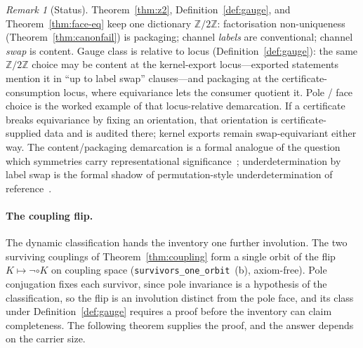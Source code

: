 \documentclass[11pt,a4paper]{article}
\theoremstyle{plain}
\theoremstyle{definition}
\theoremstyle{remark}
\newtheorem{remark}[theorem]{Remark}
\newcommand{\comp}{\circ}
\newcommand{\Ztwo}{\mathbb{Z}/2\mathbb{Z}}
\begin{document}
\begin{remark}[Status]
Theorem~\ref{thm:z2}, Definition~\ref{def:gauge}, and
Theorem~\ref{thm:face-eq} keep one dictionary $\Ztwo$: factorisation
non-uniqueness (Theorem~\ref{thm:canonfail}) is packaging; channel
\emph{labels} are conventional; channel \emph{swap} is content. Gauge
class is relative to locus
(Definition~\ref{def:gauge}): the same $\Ztwo$ choice may be content at
the kernel-export locus---exported statements mention it in ``up to
label swap'' clauses---and packaging at the certificate-consumption
locus, where equivariance lets the consumer quotient it. Pole / face
choice is the worked example of that locus-relative demarcation. If a
certificate breaks equivariance by fixing an orientation, that
orientation is certificate-supplied data and is audited there; kernel
exports remain swap-equivariant either way. The content/packaging
demarcation is a formal analogue of the question which symmetries carry
representational significance~\cite{bradingcastellani,dewar};
underdetermination by label swap is the formal shadow of
permutation-style underdetermination of reference~\cite{quine,putnam}.
\end{remark}

\paragraph{The coupling flip.}
The dynamic classification hands the inventory one further
involution. The two surviving couplings of Theorem~\ref{thm:coupling}
form a single orbit of the flip $K\mapsto\neg\comp K$ on coupling
space (\texttt{survivors\_one\_orbit}~(b), axiom-free). Pole
conjugation fixes each survivor, since pole invariance is a
hypothesis of the classification, so the flip is an involution
distinct from the pole face, and its class under
Definition~\ref{def:gauge} requires a proof before the inventory can
claim completeness. The following theorem supplies the proof, and the
answer depends on the carrier size.
\end{document}
